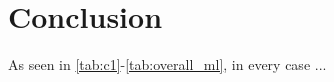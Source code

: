\section {Conclusion}
\label{conclusion}

As seen in \ref{tab:c1}-\ref{tab:overall_ml}, in every case ...



